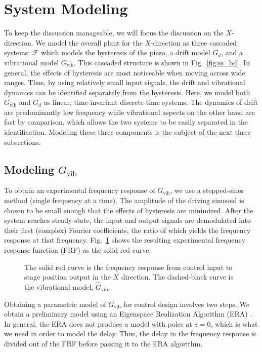 \documentclass[twocolumn,twoside]{IEEEtran}
\newcommand{\Gv}{\ensuremath{G_{\text{vib}}}\xspace}
\begin{document}
\section{System Modeling}
To keep the discussion manageable, we will focus the discussion on the $X$-direction. We model the overall plant for the $X$-direction as three cascaded systems: $\mathcal{F}$ which models the hysteresis of the piezo, a drift model $G_d$, and a vibrational model $\Gv$. This cascaded structure is shown in Fig.~\ref{fig:ss_bd}. In general, the effects of hysteresis are most noticeable when moving across wide ranges. Thus, by using relatively small input signals, the drift and vibrational dynamics can be identified separately from the hysteresis. Here, we model both $\Gv$ and $G_d$ as linear, time-invariant discrete-time systems. The dynamics of drift are predominantly low frequency while vibrational aspects on the other hand are fast by comparison, which allows the two systems to be easily separated in the identification.
 Modeling these three components is the subject of the next three subsections.


\subsection{Modeling \Gv}\label{sec:vib_model}
To obtain an experimental frequency response of $\Gv$, we use a stepped-sines method (single frequency at a time). The amplitude of the driving sinusoid is chosen to be small enough that the effects of hysteresis are minimized. After the system reaches steady-state, the input and output signals are demodulated into their first (complex) Fourier coefficients, the ratio of which yields the frequency response at that frequency. Fig.~\ref{fig:Guz2stage_frf} shows the resulting experimental frequency response function (FRF) as the solid red curve.

\begin{figure}
  \centering
  
  \caption{The solid red curve is the frequency response from control input to stage position output in the $X$ direction. The dashed-black curve is the vibrational model, $\hat{G}_{\textrm{vib}}$.}
  \label{fig:Guz2stage_frf}
\end{figure}

Obtaining a parametric model of $\Gv$ for control design involves two steps. We obtain a preliminary model using an Eigenspace Realization Algorithm (ERA) \cite{Jacques_sysidfrf}. In general, the ERA does not produce a model with poles at $z=0$, which is what we need in order to model the delay. Thus, the delay in the frequency response is divided out of the FRF before passing it to the ERA algorithm.
\end{document}
